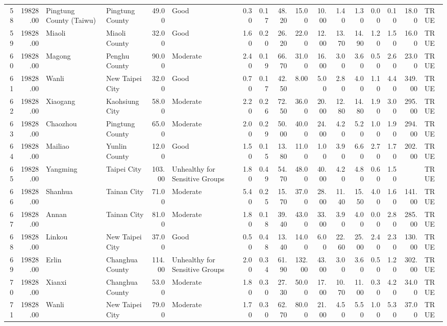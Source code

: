\begin{table}[ht]
\begin{tabular}{rrllrlrrrrrrrrrrl}
  58 & 19828.00 & Pingtung County (Taiwu) & Pingtung County & 49.00 & Good & 0.30 & 0.17 & 48.20 & 15.00 & 10.00 & 1.40 & 1.30 & 0.00 & 0.10 & 18.00 & TRUE \\ 
  59 & 19828.00 & Miaoli & Miaoli County & 32.00 & Good & 1.60 & 0.20 & 26.20 & 22.00 & 12.00 & 13.70 & 14.90 & 1.20 & 1.50 & 16.00 & TRUE \\ 
  60 & 19828.00 & Magong & Penghu County & 90.00 & Moderate & 2.40 & 0.19 & 66.70 & 31.00 & 16.00 & 3.00 & 3.60 & 0.50 & 2.60 & 23.00 & TRUE \\ 
  61 & 19828.00 & Wanli & New Taipei City & 32.00 & Good & 0.70 & 0.17 & 42.50 & 8.00 & 5.00 & 2.80 & 4.00 & 1.10 & 4.40 & 349.00 & TRUE \\ 
  62 & 19828.00 & Xiaogang & Kaohsiung City & 58.00 & Moderate & 2.20 & 0.26 & 72.50 & 36.00 & 20.00 & 12.80 & 14.80 & 1.90 & 3.00 & 295.00 & TRUE \\ 
  63 & 19828.00 & Chaozhou & Pingtung County & 65.00 & Moderate & 2.00 & 0.29 & 50.00 & 40.00 & 24.00 & 4.20 & 5.20 & 1.00 & 1.90 & 294.00 & TRUE \\ 
  64 & 19828.00 & Mailiao & Yunlin County & 12.00 & Good & 1.50 & 0.15 & 13.80 & 11.00 & 1.00 & 3.90 & 6.60 & 2.70 & 1.70 & 202.00 & TRUE \\ 
  65 & 19828.00 & Yangming & Taipei City & 103.00 & Unhealthy for Sensitive Groups & 1.80 & 0.49 & 54.70 & 48.00 & 40.00 & 4.20 & 4.80 & 0.60 & 1.50 &  & TRUE \\ 
  66 & 19828.00 & Shanhua & Tainan City & 71.00 & Moderate & 5.40 & 0.25 & 15.70 & 37.00 & 28.00 & 11.40 & 15.50 & 4.00 & 1.60 & 141.00 & TRUE \\ 
  67 & 19828.00 & Annan & Tainan City & 81.00 & Moderate & 1.80 & 0.18 & 39.40 & 43.00 & 33.00 & 3.90 & 4.00 & 0.00 & 2.80 & 285.00 & TRUE \\ 
  68 & 19828.00 & Linkou & New Taipei City & 37.00 & Good & 0.50 & 0.48 & 13.40 & 14.00 & 6.00 & 22.60 & 25.00 & 2.40 & 2.30 & 130.00 & TRUE \\ 
  69 & 19828.00 & Erlin & Changhua County & 114.00 & Unhealthy for Sensitive Groups & 2.00 & 0.34 & 61.90 & 132.00 & 43.00 & 3.00 & 3.60 & 0.50 & 1.20 & 302.00 & TRUE \\ 
  70 & 19828.00 & Xianxi & Changhua County & 53.00 & Moderate & 1.80 & 0.30 & 27.30 & 50.00 & 17.00 & 10.70 & 11.00 & 0.30 & 4.20 & 34.00 & TRUE \\ 
  71 & 19828.00 & Wanli & New Taipei City & 79.00 & Moderate & 1.70 & 0.30 & 62.70 & 80.00 & 21.00 & 4.50 & 5.50 & 1.00 & 5.30 & 37.00 & TRUE \\ 

\end{tabular}
\end{table}
